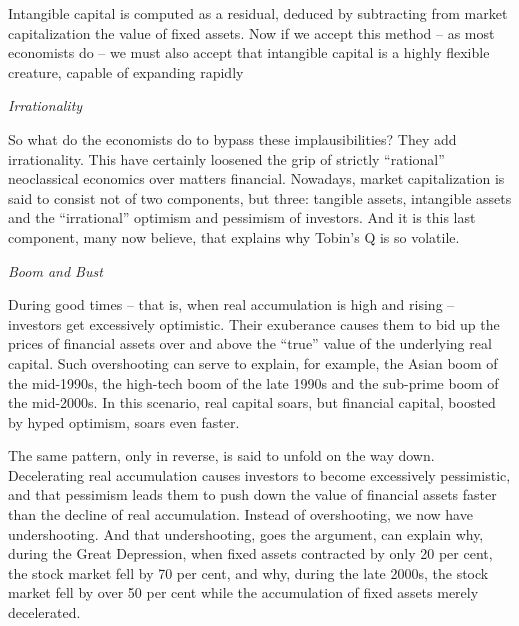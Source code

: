 \documentclass[
]{book}
\begin{document}
Intangible capital is computed as a residual, deduced by subtracting from market capitalization the value of fixed assets. Now if we accept this method -- as most economists do -- we must also accept that intangible capital is a highly flexible creature, capable of expanding rapidly

\emph{Irrationality}

So what do the economists do to bypass these implausibilities? They add irrationality.
This have certainly loosened the grip of strictly ``rational'' neoclassical economics over matters financial. Nowadays, market capitalization is said to consist not of two components, but three: tangible assets, intangible assets and the ``irrational'' optimism and pessimism of investors. And it is this last component, many now believe, that explains why Tobin's Q is so volatile.

\emph{Boom and Bust}

During good times -- that is, when real accumulation is high and rising -- investors get excessively optimistic. Their exuberance causes them to bid up the prices of financial assets over and above the ``true'' value of the underlying real capital. Such overshooting can serve to explain, for example, the Asian boom of the mid-1990s, the high-tech boom of the late 1990s and the sub-prime boom of the mid-2000s. In this scenario, real capital soars, but financial capital, boosted by hyped optimism, soars even faster.

The same pattern, only in reverse, is said to unfold on the way down. Decelerating real accumulation causes investors to become excessively pessimistic, and that pessimism leads them to push down the value of financial assets faster than the decline of real accumulation. Instead of overshooting, we now have undershooting. And that undershooting, goes the argument, can explain why, during the Great Depression, when fixed assets contracted by only 20 per cent, the stock market fell by 70 per cent, and why, during the late 2000s, the stock market fell by over 50 per cent while the accumulation of fixed assets merely decelerated.
\end{document}
